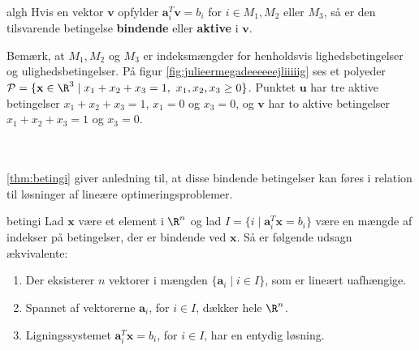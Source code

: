 %
\begin{defn}{}{algh}
Hvis en vektor $\textbf{v}$ opfylder $\textbf{a}^T_i\textbf{v}= b_i$ for $i \in M_1, M_2$ eller $M_3$, så er den tilsvarende betingelse \textbf{bindende} eller \textbf{aktive} i $\textbf{v}$.
\end{defn}\noindent
%
Bemærk, at $M_1, M_2$ og $M_3$ er indeksmængder for henholdsvis lighedsbetingelser og ulighedsbetingelser.
På figur \ref{fig:julieermegadeeeeeejliiiiig} ses et polyeder $\mathcal{P}= \{ \mathbf{x} \in \R^3 \mid x_1 + x_2 + x_3 = 1, \text{  } x_1 , x_2, x_3 \geq 0  \}$. 
Punktet $\textbf{u}$ har tre aktive betingelser $x_1 + x_2 + x_3 = 1$, $x_1=0$ og $x_3=0$, og $\mathbf{v}$ har to aktive betingelser $x_1 + x_2 + x_3 = 1$ og $x_3=0$.
%

\\\\
%
\ref{thm:betingi} giver anledning til, at disse bindende betingelser kan føres i relation til løsninger af lineære optimeringsproblemer.
%
%
\begin{thm}{}{betingi}
Lad $\textbf{x}$ være et element i $\R^n$ og lad $I=\{i \mid \textbf{a}^T_i\textbf{x}=b_i\}$ være en mængde af indekser på betingelser, der er bindende ved $\textbf{x}$.
Så er følgende udsagn ækvivalente:
%
\begin{enumerate}[label=(\alph*)]
\item Der eksisterer $n$ vektorer i mængden $\{\textbf{a}_i \mid i \in I \}$, som er lineært uafhængige.
\item Spannet af vektorerne $\textbf{a}_i$, for $i \in I$, dækker hele $\R^n$.
\item Ligningssystemet $\textbf{a}^T_i\textbf{x}= b_i$, for $i \in I$, har en entydig løsning.
\end{enumerate}
\end{thm}
%
